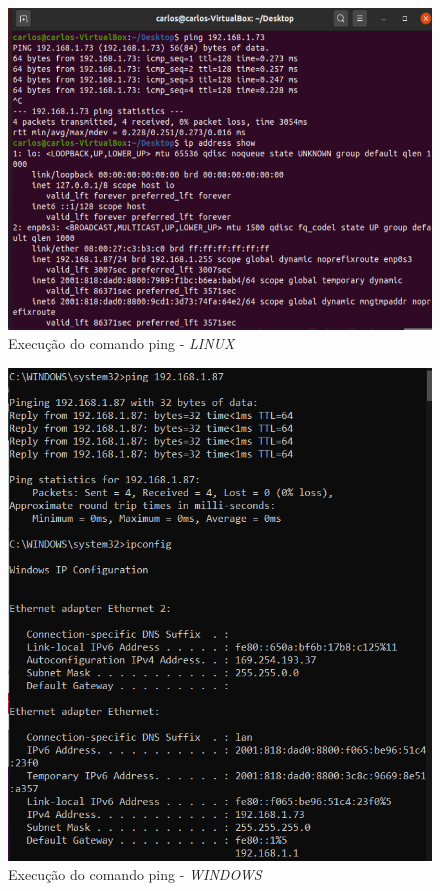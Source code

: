 \documentclass{article}
\begin{document}
	\newpage 
	\begin{figure}[!htb]
		\centering
		\includegraphics[scale=0.5]{tp_sosd_a2.1}
		\caption{Execução do comando ping - \textit{LINUX}}
	\end{figure}

	\vspace{2 em}

	\begin{figure}[!htb]
		\centering
		\includegraphics[scale=0.5]{tp_sosd_a2.2}
		\caption{Execução do comando ping - \textit{WINDOWS}}
	\end{figure}
	
\end{document}
